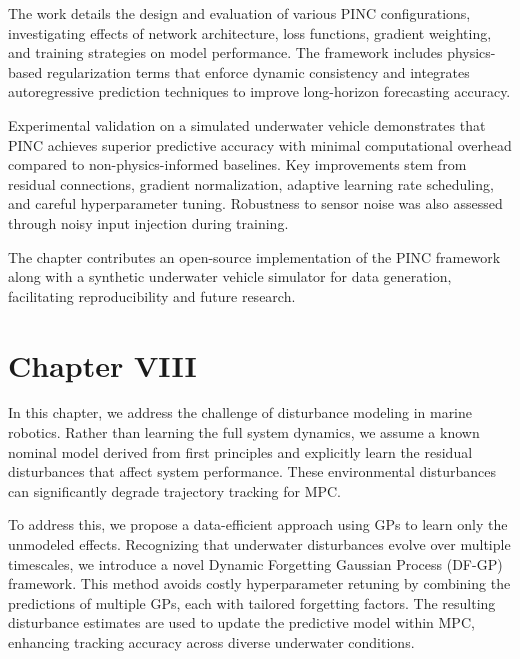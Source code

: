 The work details the design and evaluation of various PINC configurations, investigating effects of network architecture, loss functions, gradient weighting, and training strategies on model performance. The framework includes physics-based regularization terms that enforce dynamic consistency and integrates autoregressive prediction techniques to improve long-horizon forecasting accuracy.

Experimental validation on a simulated underwater vehicle demonstrates that PINC achieves superior predictive accuracy with minimal computational overhead compared to non-physics-informed baselines. Key improvements stem from residual connections, gradient normalization, adaptive learning rate scheduling, and careful hyperparameter tuning. Robustness to sensor noise was also assessed through noisy input injection during training.

The chapter contributes an open-source implementation of the PINC framework along with a synthetic underwater vehicle simulator for data generation, facilitating reproducibility and future research.



\section{Chapter VIII}
\label{ch:dfgp}

In this chapter, we address the challenge of disturbance modeling in marine robotics. Rather than learning the full system dynamics, we assume a known nominal model derived from first principles and explicitly learn the residual disturbances that affect system performance. These environmental disturbances can significantly degrade trajectory tracking for MPC. 

To address this, we propose a data-efficient approach using GPs to learn only the unmodeled effects. Recognizing that underwater disturbances evolve over multiple timescales, we introduce a novel Dynamic Forgetting Gaussian Process (DF-GP) framework. This method avoids costly hyperparameter retuning by combining the predictions of multiple GPs, each with tailored forgetting factors. The resulting disturbance estimates are used to update the predictive model within MPC, enhancing tracking accuracy across diverse underwater conditions.




